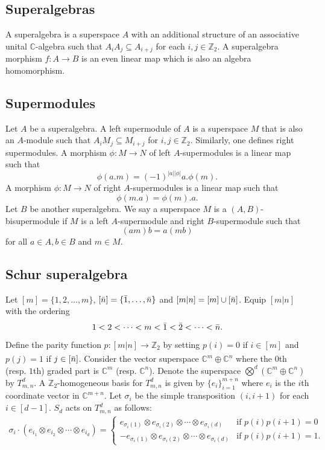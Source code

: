 \documentclass[12pt,reqno]{amsart}
\theoremstyle{definition}
\theoremstyle{remark}
\newcommand{\T}{T_{m,n}^{d}}
\begin{document}
\subsection{Superalgebras} A superalgebra is a superspace $A$ with an additional structure of an associative unital $\mathbb{C}$-algebra such that $A_{i}A_{j}\subseteq A_{i+j}$ for each $i,j\in\mathbb{Z}_{2}$. A superalgebra morphism $f:A\xrightarrow{}B$ is an even linear map which is also an algebra homomorphism.

\subsection{Supermodules}
Let $A$ be a superalgebra. A left supermodule of $A$ is a superspace $M$ that is also an $A$-module such that $A_{i}M_{j}\subseteq M_{i+j}$ for $i,j\in\mathbb{Z}_{2}$. Similarly, one defines right supermodules. A morphism $\phi:M\xrightarrow{}N$ of left $A$-supermodules is a linear map such that $$\phi(a.m)=(-1)^{|a||\phi|}a.\phi(m).$$
A morphism $\phi:M\xrightarrow{}N$ of right $A$-supermodules is a linear map such that $$\phi(m.a)=\phi(m).a.$$
Let $B$ be another superalgebra. We say a superspace $M$ is a $(A,B)$-bisupermodule if $M$ is a left $A$-supermodule and right $B$-supermodule such that
$$(am)b=a(mb)$$ for all $a\in A, b\in B$ and $m\in M$.
\subsection{Schur superalgebra}\label{superPolynomials}
Let $[m]=\{1,2,\dotsc,m\}$, $[\Bar{n}]=\{\Bar{1},\dotsc,\Bar{n}\}$ and $[m|n]=[m]\cup[\Bar{n}]$. Equip $[m|n]$ with the ordering $$1<2<\cdots<m<\Bar{1}<\Bar{2}<\cdots<\Bar{n}.$$ Define the parity function $p:[m|n]\xrightarrow[]{}\mathbb{Z}_{2}$ by setting $p(i)=0$ if $i\in [m]$ and $p({j})=1$ if $j\in [\Bar{n}]$. Consider the vector superspace $\mathbb{C}^{m}\oplus \mathbb{C}^{n}$ where the $0$th (resp. $1$th) graded part is $\mathbb{C}^{m}$ (resp. $\mathbb{C}^{n}$). Denote the superspace $\bigotimes^{d}(\mathbb{C}^{m}\oplus \mathbb{C}^{n})$ by $\T$. A $\mathbb{Z}_2$-homogeneous basis for $\T$ is given by $\{e_{i}\}_{i=1}^{m+n}$ where $e_{i}$ is the $i$th coordinate vector in $\mathbb C^{m+n}$. Let $\sigma_i$ be the simple transposition $(i,i+1)$ for each $i\in[d-1]$. $S_d$ acts on $\T$ \cite[Definition 1.3 and Lemma 4.10]{berele1987hook}  as follows:
\begin{align}\label{symmetricAction}
\sigma_i\cdot (e_{i_{1}}\otimes e_{i_{2}}\otimes\cdots\otimes e_{i_{d}})=
    \begin{cases}
        e_{\sigma_i(1)}\otimes e_{\sigma_i(2)}\otimes\cdots\otimes e_{\sigma_i(d)} &\text{if }p(i)p(i+1)=0\\
        -e_{\sigma_i(1)}\otimes e_{\sigma_i(2)}\otimes\cdots\otimes e_{\sigma_i(d)}&\text{if }p(i)p(i+1)=1.
    \end{cases}
\end{align}
\end{document}
